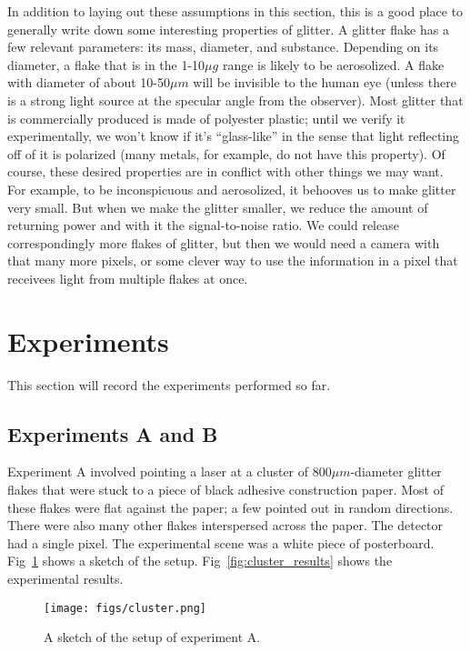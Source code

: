 \documentclass[11pt]{article}
\begin{document}
In addition to laying out these assumptions in this section, this is a good place to generally write down some interesting properties of glitter. A glitter flake has a few relevant parameters: its mass, diameter, and substance. Depending on its diameter, a flake that is in the 1-10$\mu g$ range is likely to be aerosolized. A flake with diameter of about 10-50$\mu m$ will be invisible to the human eye (unless there is a strong light source at the specular angle from the observer). Most glitter that is commercially produced is made of polyester plastic; until we verify it experimentally, we won't know if it's ``glass-like'' in the sense that light reflecting off of it is polarized (many metals, for example, do not have this property). Of course, these desired properties are in conflict with other things we may want. For example, to be inconspicuous and aerosolized, it behooves us to make glitter very small. But when we make the glitter smaller, we reduce the amount of returning power and with it the signal-to-noise ratio. We could release correspondingly more flakes of glitter, but then we would need a camera with that many more pixels, or some clever way to use the information in a pixel that receivees light from multiple flakes at once.

\section{Experiments}

This section will record the experiments performed so far.

\subsection{Experiments A and B}

Experiment A involved pointing a laser at a cluster of 800$\mu m$-diameter glitter flakes that were stuck to a piece of black adhesive construction paper. Most of these flakes were flat against the paper; a few pointed out in random directions. There were also many other flakes interspersed across the paper. The detector had a single pixel. The experimental scene was a white piece of posterboard. Fig~\ref{fig:cluster} shows a sketch of the setup. Fig~\ref{fig:cluster_results} shows the experimental results.

\begin{figure}
\begin{center}
\texttt{[image: figs/cluster.png]} 
\caption{A sketch of the setup of experiment A. \label{fig:cluster}}
\end{center}
\end{figure}
\end{document}
